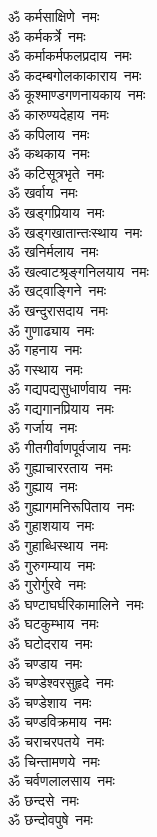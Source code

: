 \begin{multicols}{2}
\begin{flushleft}
ॐ कर्मसाक्षिणे~नमः\\
ॐ कर्मकर्त्रे~नमः\\
ॐ कर्माकर्मफलप्रदाय~नमः\\
ॐ कदम्बगोलकाकाराय~नमः\\
ॐ कूश्माण्डगणनायकाय~नमः\\
ॐ कारुण्यदेहाय~नमः\\
ॐ कपिलाय~नमः\\
ॐ कथकाय~नमः\\
ॐ कटिसूत्रभृते~नमः\\
ॐ खर्वाय~नमः\hfill{}\\
ॐ खड्गप्रियाय~नमः\\
ॐ खड्गखातान्तःस्थाय~नमः\\
ॐ खनिर्मलाय~नमः\\
ॐ खल्वाटश्रृङ्गनिलयाय~नमः\\
ॐ खट्वाङ्गिने~नमः\\
ॐ खन्दुरासदाय~नमः\\
ॐ गुणाढ्याय~नमः\\
ॐ गहनाय~नमः\\
ॐ गस्थाय~नमः\\
ॐ गद्यपद्यसुधार्णवाय~नमः\hfill{}\\
ॐ गद्यगानप्रियाय~नमः\\
ॐ गर्जाय~नमः\\
ॐ गीतगीर्वाणपूर्वजाय~नमः\\
ॐ गुह्याचाररताय~नमः\\
ॐ गुह्याय~नमः\\
ॐ गुह्यागमनिरूपिताय~नमः\\
ॐ गुहाशयाय~नमः\\
ॐ गुहाब्धिस्थाय~नमः\\
ॐ गुरुगम्याय~नमः\\
ॐ गुरोर्गुरवे~नमः\hfill{}\\
ॐ घण्टाघर्घरिकामालिने~नमः\\
ॐ घटकुम्भाय~नमः\\
ॐ घटोदराय~नमः\\
ॐ चण्डाय~नमः\\
ॐ चण्डेश्वरसुहृदे~नमः\\
ॐ चण्डेशाय~नमः\\
ॐ चण्डविक्रमाय~नमः\\
ॐ चराचरपतये~नमः\\
ॐ चिन्तामणये~नमः\\
ॐ चर्वणलालसाय~नमः\hfill{}\\
ॐ छन्दसे~नमः\\
ॐ छन्दोवपुषे~नमः\\

\end{flushleft}
\end{multicols}
